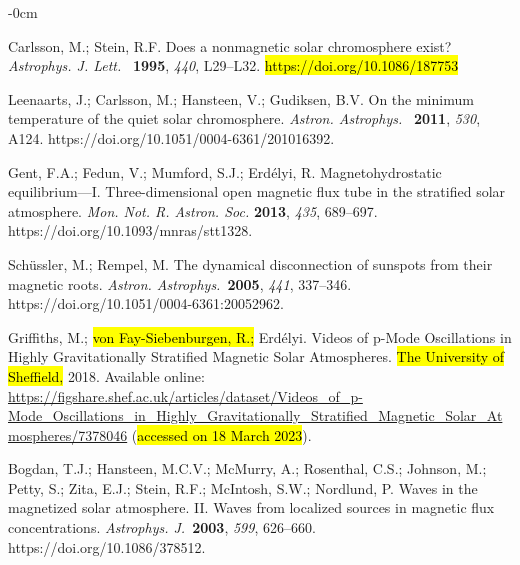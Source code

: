\documentclass[physics,article,accept,pdftex,moreauthors]{Definitions/mdpi}
\newcommand{\aap}{{\it Astron. Astrophys.}}
\newcommand{\apj}{{\it Astrophys. J.}}
\newcommand{\apjl}{{\it Astrophys. J. Lett.}}
\begin{document}
\begin{adjustwidth}{-\extralength}{0cm}
\begin{thebibliography}{999}
{		
		{Carlsson}, M.; {Stein}, R.F. {Does a nonmagnetic solar chromosphere
			exist?} \apjl~ \textbf{1995}, \emph{440}, L29--L32.
  \hl{https://doi.org/10.1086/187753} 		

		Leenaarts, J.; Carlsson, M.; Hansteen, V.; Gudiksen, B.V. On the minimum temperature of the quiet solar chromosphere. \aap~ \textbf{2011}, \emph{530}, A124. https://doi.org/10.1051/0004-6361/201016392.
		
		Gent, F.A.; Fedun, V.; Mumford, S.J.; Erd\'elyi, R. Magnetohydrostatic 
equilibrium---I. Three-dimensional open magnetic flux tube in the stratified solar atmosphere. \emph{Mon. Not. R. Astron. Soc.} \textbf{2013}, \emph{435}, 689--697. https://doi.org/10.1093/mnras/stt1328.
		
		Schüssler, M.; Rempel, M. The dynamical disconnection of sunspots from their magnetic roots. \aap~\textbf{2005}, \emph{441}, 337--346. https://doi.org/10.1051/0004-6361:20052962.
		
		{Griffiths}, M.; 
 \hl{von Fay-Siebenburgen, R.;} %
{Erd{\'e}lyi}. %
{Videos of p-Mode Oscillations in Highly Gravitationally Stratified Magnetic Solar Atmospheres}. 
\hl{The University of Sheffield,} %
2018. Available online: 
\url{https://figshare.shef.ac.uk/articles/dataset/Videos_of_p-Mode_Oscillations_in_Highly_Gravitationally_Stratified_Magnetic_Solar_Atmospheres/7378046} 
(\hl{accessed on 18 March 2023}).
		
		Bogdan, T.J.; Hansteen, M.C.V.; McMurry, A.; Rosenthal, C.S.; Johnson, M.; Petty, S.; Zita, E.J.; Stein, R.F.; McIntosh, 
S.W.; Nordlund, P. Waves in the magnetized solar atmosphere. II. Waves from localized sources in magnetic flux concentrations. \apj~\textbf{2003}, \emph{599}, 626--660. https://doi.org/10.1086/378512.
		
}
\end{thebibliography}
\end{adjustwidth}
\end{document}
